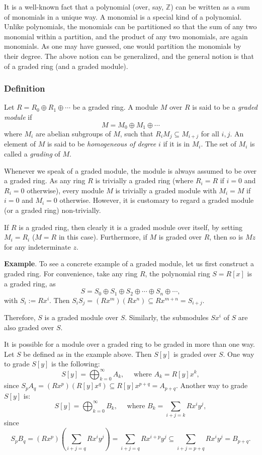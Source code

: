\documentclass[12pt]{article}
\begin{document}
It is a well-known fact that a polynomial (over, say, $\mathbb{Z}$) can be written as a sum of monomials in a unique way.  A monomial is a special kind of a polynomial.  Unlike polynomials, the monomials can be partitioned so that the sum of any two monomial within a partition, and the product of any two monomials, are again monomials.  As one may have guessed, one would partition the monomials by their degree.  The above notion can be generalized, and the general notion is that of a graded ring (and a graded module).

\subsubsection*{Definition}

Let $R = R_0 \oplus R_1 \oplus \cdots$ be a graded ring.  A module $M$ over $R$ is said to be a \emph{graded module} if 
$$M = M_0 \oplus M_1 \oplus \cdots$$
where $M_i$ are abelian subgroups of $M$, such that $R_i M_j \subseteq M_{i+j}$ for all $i,j$.  An element of $M$ is said to be \emph{homogeneous of degree} $i$ if it is in $M_i$.  The set of $M_i$ is called a \emph{grading} of $M$.

Whenever we speak of a graded module, the module is always assumed to be over a graded ring.  As any ring $R$ is trivially a graded ring (where $R_i=R$ if $i=0$ and $R_i=0$ otherwise), every module $M$ is trivially a graded module with $M_i=M$ if $i=0$ and $M_i=0$ otherwise.  However, it is customary to regard a graded module (or a graded ring) non-trivially.

If $R$ is a graded ring, then clearly it is a graded module over itself, by setting $M_i=R_i$ ($M=R$ in this case).  Furthermore, if $M$ is graded over $R$, then so is $Mz$ for any indeterminate $z$.

\textbf{Example}.  To see a concrete example of a graded module, let us first construct a graded ring.  For convenience, take any ring $R$, the polynomial ring $S=R[x]$  is a graded ring, as $$S=S_0\oplus S_1 \oplus S_2 \oplus \cdots \oplus S_n \oplus \cdots,$$ with $S_i:=Rx^i$.  Then $S_iS_j=(Rx^m)(Rx^n)\subseteq Rx^{m+n}=S_{i+j}$.

Therefore, $S$ is a graded module over $S$.  Similarly, the submodules $Sx^i$ of $S$ are also graded over $S$.

It is possible for a module over a graded ring to be graded in more than one way.  Let $S$ be defined as in the example above.  Then $S[y]$ is graded over $S$.  One way to grade $S[y]$ is the following:
$$S[y]=\bigoplus_{k=0}^{\infty} A_k,\quad\textrm{ where }A_k=R[y]x^k,$$
since $S_pA_q=(Rx^p)(R[y]x^q)\subseteq R[y]x^{p+q}=A_{p+q}$.  Another way to grade $S[y]$ is:
$$S[y]=\bigoplus_{k=0}^{\infty} B_k,\quad\textrm{ where }B_k=\sum_{i+j=k}Rx^iy^j,$$
since $$S_pB_q=(Rx^p)(\sum_{i+j=q}Rx^iy^j)=\sum_{i+j=q}Rx^{i+p}y^j\subseteq \sum_{i+j=p+q}Rx^iy^j=B_{p+q}.$$
\end{document}
